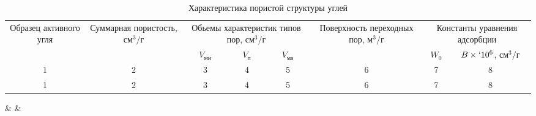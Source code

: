 
\begin{center}
\small
\begin{longtable}{cccccccc}
\caption{Характеристика пористой структуры углей}
\label{tabular:harakporestruktur} \\
\hline
\multirow{2}{2cm}{Образец активного угля}&
\multirow{2}{2cm}{Суммарная пористость, $\textit{см}^3/\textit{г}$}&
\multicolumn{3}{m{3cm}}{Обьемы характеристик типов пор, $\textit{см}^3/\textit{г}$}&
\multirow{1}{2.5cm}{Поверхность переходных пор, $\textit{м}^3/\textit{г}$}&
\multicolumn{2}{m{3cm}}{Константы уравнения адсорбции} \\
&&$V_\textit{ми}$&$V_\textit{п}$&$V_\textit{ма}$&&$W_0$&
\multicolumn{1}{m{2cm}}{$B \times` 10^6$, $\textit{см}^3/\textit{г}$}\\

\hline
\multicolumn{1}{c}{1}&
\multicolumn{1}{c}{2}&
\multicolumn{1}{c}{3}&
\multicolumn{1}{c}{4}&
\multicolumn{1}{c}{5}&
\multicolumn{1}{c}{6}&
\multicolumn{1}{c}{7}&
\multicolumn{1}{c}{8}\\
\hline \endfirsthead%
\hline
\multicolumn{1}{c}{1}&
\multicolumn{1}{c}{2}&
\multicolumn{1}{c}{3}&
\multicolumn{1}{c}{4}&
\multicolumn{1}{c}{5}&
\multicolumn{1}{c}{6}&
\multicolumn{1}{c}{7}&
\multicolumn{1}{c}{8}\\
\hline \endhead



\hline
\end{longtable}
\end{center}

            &
            &
             \tabularnewline

